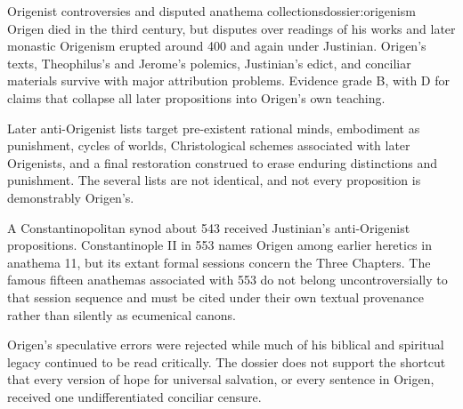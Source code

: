 \begin{heresydossier}{Origenist controversies and disputed anathema collections}{dossier:origenism}
\objectfield Origen died in the third century, but disputes over readings of his works and later monastic Origenism erupted around 400 and again under Justinian. Origen's texts, Theophilus's and Jerome's polemics, Justinian's edict, and conciliar materials survive with major attribution problems. Evidence grade B, with D for claims that collapse all later propositions into Origen's own teaching.

\propositionfield Later anti-Origenist lists target pre-existent rational minds, embodiment as punishment, cycles of worlds, Christological schemes associated with later Origenists, and a final restoration construed to erase enduring distinctions and punishment. The several lists are not identical, and not every proposition is demonstrably Origen's.

\responsefield A Constantinopolitan synod about 543 received Justinian's anti-Origenist propositions. Constantinople II in 553 names Origen among earlier heretics in anathema 11, but its extant formal sessions concern the Three Chapters. The famous fifteen anathemas associated with 553 do not belong uncontroversially to that session sequence and must be cited under their own textual provenance rather than silently as ecumenical canons.

\aftermathfield Origen's speculative errors were rejected while much of his biblical and spiritual legacy continued to be read critically. The dossier does not support the shortcut that every version of hope for universal salvation, or every sentence in Origen, received one undifferentiated conciliar censure.
\end{heresydossier}

